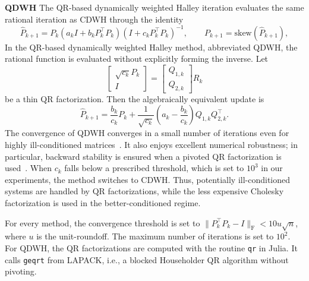 \documentclass[final,onefignum,onetabnum,dvipsnames]{siamart251216}
\numberwithin{algorithm}{section}
\numberwithin{equation}{section}
\newcommand{\new}[1]{#1}
\begin{document}
\begin{paragraph}{\bf QDWH}
    The QR-based dynamically weighted Halley iteration evaluates the
    same rational iteration as CDWH through the identity
    \[
        \widehat P_{k+1}
        =
        P_k(a_kI+b_kP_k^\top P_k)
        (I+c_kP_k^\top P_k)^{-1},
        \qquad
        P_{k+1}=\mathrm{skew}(\widehat P_{k+1}),
    \]
    In the QR-based dynamically
    weighted Halley method, abbreviated QDWH, the rational function is
    evaluated without explicitly forming the inverse. Let
    \[
        \begin{bmatrix}
            \sqrt{c_k}P_k\\
            I
        \end{bmatrix}
        =
        \begin{bmatrix}
            Q_{1,k}\\
            Q_{2,k}
        \end{bmatrix}R_k
    \]
    be a thin QR factorization. Then the algebraically equivalent update
    is
    \[
        \widehat P_{k+1}
        =
        \frac{b_k}{c_k}P_k
        +
        \frac{1}{\sqrt{c_k}}
        \left(a_k-\frac{b_k}{c_k}\right)
        Q_{1,k}Q_{2,k}^\top.
    \]
    The convergence of QDWH converges in a small number of iterations even for highly
    ill-conditioned matrices~\cite{NakatsukasaBaiGygi2010}. It also enjoys excellent numerical robustness; in particular,
    backward stability is ensured when a pivoted QR factorization is used~\cite{NakatsukasaHigham2012}. \new{When $c_k$ falls below a prescribed
    threshold, which is set to $10^3$ in our experiments, the method switches to CDWH.
    Thus, potentially ill-conditioned systems are handled by 
    QR factorizations, while the less expensive Cholesky factorization is used in the better-conditioned regime.}
\end{paragraph}

\new{For every method, the convergence threshold is set to $\|P_k^\top P_k - I\|_\mathrm{F} < 10u\sqrt{n}$, where $u$ is the unit-roundoff. The maximum number of iterations is set to $10^2$. For QDWH, the QR factorizations are computed with the routine \texttt{qr} in Julia. It calls \texttt{geqrt} from LAPACK, i.e., a blocked Householder QR algorithm without pivoting.}
\end{document}
